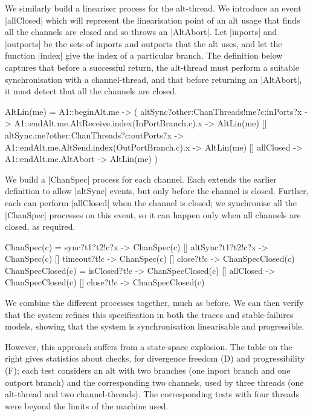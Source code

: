 We similarly build a lineariser process for the alt-thread.  We introduce an
event |allClosed| which will represent the linearisation point of an alt usage
that finds all the channels are closed and so throws an |AltAbort|.  
%
Let |inports| and |outports| be the sets of inports and outports that the alt
uses, and let the function |index| give the index of a particular branch.  The
definition below captures that before a successful return, the alt-thread must
perform a suitable synchronisation with a channel-thread, and that before
returning an |AltAbort|, it must detect that all the channels are closed. 
%
\begin{cspm}
AltLin(me) = 
  A1::beginAlt.me -> (
    altSync?other:ChanThreads!me?c:inPorts?x -> 
      A1::endAlt.me.AltReceive.index(InPortBranch.c).x -> AltLin(me)
    [] altSync.me?other:ChanThreads?c:outPorts?x ->
        A1::endAlt.me.AltSend.index(OutPortBranch.c).x -> AltLin(me)
    [] allClosed -> A1::endAlt.me.AltAbort -> AltLin(me)
  )
\end{cspm}

We build a |ChanSpec| process for each channel.  Each extends the earlier
definition to allow |altSync| events, but only before the channel is closed.
Further, each can perform |allClosed| when the channel is closed; we
synchronise all the |ChanSpec| processes on this event, so it can happen only
when all channels are closed, as required.
%
\begin{cspm}
ChanSpec(c) = 
  sync?t1?t2!c?x -> ChanSpec(c) [] altSync?t1?t2!c?x -> ChanSpec(c) 
  [] timeout?t!c -> ChanSpec(c)   [] close?t!c -> ChanSpecClosed(c)
ChanSpecClosed(c) =
  isClosed?t!c -> ChanSpecClosed(c) [] allClosed -> ChanSpecClosed(c)
  [] close?t!c -> ChanSpecClosed(c)
\end{cspm}

We combine the different processes together, much as before.  We can then
verify that the system refines this specification in both the traces and
stable-failures models, showing that the system is synchronisation
linearisable and progressible.

\begin{window}
%
However, this approach suffers from a state-space explosion.  The table on the
right gives statistics about checks, for divergence freedom (D) and
progressibility (F); each test considers an alt with two branches (one inport
branch and one outport branch) and the corresponding two channels, used by
three threads (one alt-thread and two channel-threads).  The corresponding
tests with four threads were beyond the limits of the machine used. 
\end{window}
